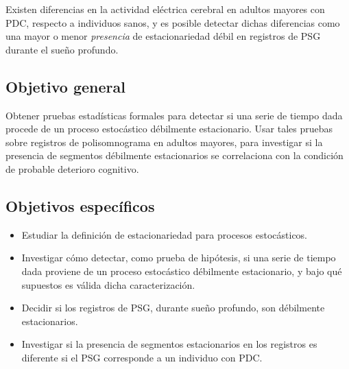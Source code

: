 Existen diferencias en la actividad eléctrica cerebral en adultos mayores con PDC, respecto a 
individuos sanos, y es posible detectar dichas diferencias como una mayor o menor 
\textit{presencia} de estacionariedad débil en registros de PSG durante el sueño profundo.


\subsection{Objetivo general}

Obtener pruebas estadísticas formales para detectar si una serie de tiempo dada procede de un
proceso estocástico débilmente estacionario.
%
Usar tales pruebas sobre registros de polisomnograma en adultos mayores, para investigar si la 
presencia de segmentos débilmente estacionarios se correlaciona con la condición de probable
deterioro cognitivo.


\subsection{Objetivos específicos}

\begin{itemize}
\item Estudiar la definición de estacionariedad para procesos estocásticos.

\item Investigar cómo detectar, como prueba de hipótesis, si una serie de tiempo dada proviene
de un proceso estocástico débilmente estacionario, y bajo qué supuestos 
es válida dicha caracterización.

\item Decidir si los registros de PSG, durante sueño profundo, son débilmente estacionarios.

\item Investigar si la presencia de segmentos estacionarios en los registros es diferente si el
PSG corresponde a un individuo con PDC.
\end{itemize}

